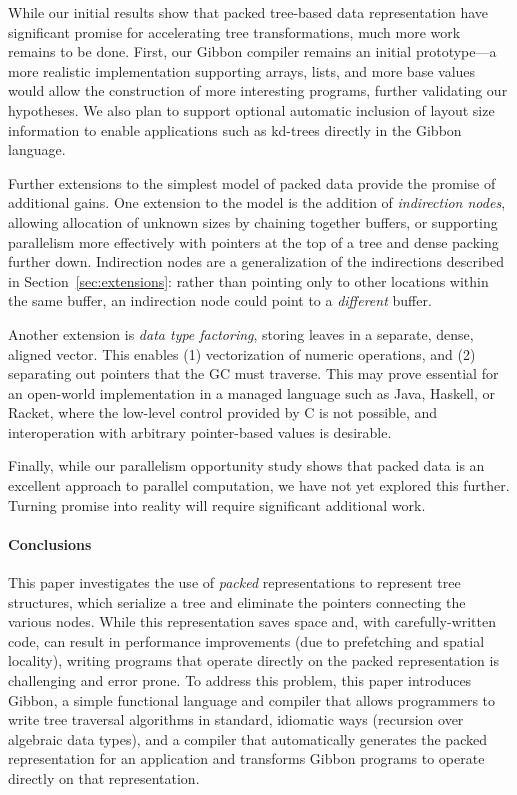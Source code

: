 \documentclass[a4paper,english]{lipics-v2016}
\newcommand{\treelang}{Gibbon\xspace} %
\begin{document}
While our initial results show that packed tree-based data
representation have significant promise for accelerating tree
transformations, much more work remains to be done. First,
our \treelang compiler remains an initial prototype---a more realistic
implementation supporting arrays, lists, and more base values would
allow the construction of more interesting programs, further
validating our hypotheses. We also plan to support optional automatic
inclusion of layout size information to enable applications such as
kd-trees directly in the \treelang language.

Further extensions to the simplest model of packed data provide the
promise of additional gains. One extension to the model is the
addition of \emph{indirection nodes}, allowing allocation of unknown
sizes by chaining together buffers, or supporting parallelism more
effectively with pointers at the top of a tree and dense packing
further down. Indirection nodes are a generalization of the indirections
described in Section~\ref{sec:extensions}: rather than pointing only to other
locations within the same buffer, an indirection node could point to a {\em
different} buffer.

Another extension is \emph{data type factoring}, storing
leaves in a separate, dense, aligned vector.  This enables (1)
vectorization of numeric operations, and (2) separating out pointers
that the GC must traverse.  This may prove essential for an open-world
implementation in a managed language such as Java, Haskell, or Racket,
where the low-level control provided by C is not possible, and
interoperation with arbitrary pointer-based values is desirable.

Finally, while our parallelism opportunity study shows that packed
data is an excellent approach to parallel computation, we have not yet
explored this further. Turning promise into reality will require
significant additional work.

\paragraph*{Conclusions}

This paper investigates the use of {\em packed} representations to represent
tree structures, which serialize a tree and eliminate the pointers connecting
the various nodes. While this representation saves space and, with
carefully-written code, can result in performance improvements (due to
prefetching and spatial locality), writing programs that operate directly on
the packed representation is challenging and error prone. To address this
problem, this paper introduces \treelang{}, a simple functional language and
compiler that allows programmers to write tree traversal algorithms in
standard, idiomatic ways (recursion over algebraic data types), and a compiler
that automatically generates the packed representation for an application and
transforms \treelang{} programs to operate directly on that representation.
\end{document}
